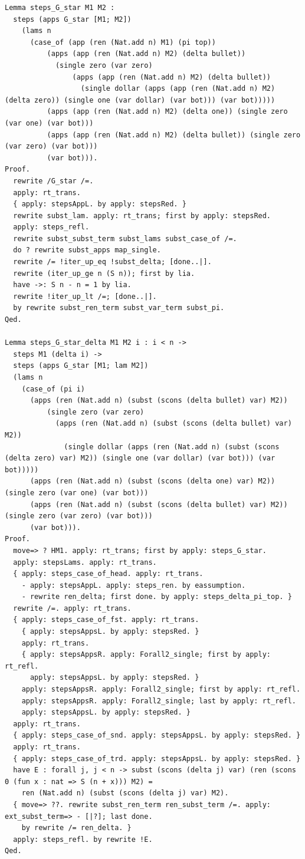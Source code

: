 \documentclass[10pt,a4paper]{amsart}
\begin{document}
\begin{lstlisting}
Lemma steps_G_star M1 M2 :
  steps (apps G_star [M1; M2])
    (lams n
      (case_of (app (ren (Nat.add n) M1) (pi top))
          (apps (app (ren (Nat.add n) M2) (delta bullet))
            (single zero (var zero)
                (apps (app (ren (Nat.add n) M2) (delta bullet))
                  (single dollar (apps (app (ren (Nat.add n) M2) (delta zero)) (single one (var dollar) (var bot))) (var bot)))))
          (apps (app (ren (Nat.add n) M2) (delta one)) (single zero (var one) (var bot)))
          (apps (app (ren (Nat.add n) M2) (delta bullet)) (single zero (var zero) (var bot)))
          (var bot))).
Proof.
  rewrite /G_star /=.
  apply: rt_trans.
  { apply: stepsAppL. by apply: stepsRed. }
  rewrite subst_lam. apply: rt_trans; first by apply: stepsRed.
  apply: steps_refl.
  rewrite subst_subst_term subst_lams subst_case_of /=.
  do ? rewrite subst_apps map_single.
  rewrite /= !iter_up_eq !subst_delta; [done..|].
  rewrite (iter_up_ge n (S n)); first by lia.
  have ->: S n - n = 1 by lia.
  rewrite !iter_up_lt /=; [done..|].
  by rewrite subst_ren_term subst_var_term subst_pi.
Qed.

Lemma steps_G_star_delta M1 M2 i : i < n ->
  steps M1 (delta i) ->
  steps (apps G_star [M1; lam M2])
  (lams n
    (case_of (pi i)
      (apps (ren (Nat.add n) (subst (scons (delta bullet) var) M2))
          (single zero (var zero)
            (apps (ren (Nat.add n) (subst (scons (delta bullet) var) M2))
              (single dollar (apps (ren (Nat.add n) (subst (scons (delta zero) var) M2)) (single one (var dollar) (var bot))) (var bot)))))
      (apps (ren (Nat.add n) (subst (scons (delta one) var) M2)) (single zero (var one) (var bot))) 
      (apps (ren (Nat.add n) (subst (scons (delta bullet) var) M2)) (single zero (var zero) (var bot)))
      (var bot))).
Proof.
  move=> ? HM1. apply: rt_trans; first by apply: steps_G_star.
  apply: stepsLams. apply: rt_trans.
  { apply: steps_case_of_head. apply: rt_trans.
    - apply: stepsAppL. apply: steps_ren. by eassumption.
    - rewrite ren_delta; first done. by apply: steps_delta_pi_top. }
  rewrite /=. apply: rt_trans.
  { apply: steps_case_of_fst. apply: rt_trans.
    { apply: stepsAppsL. by apply: stepsRed. }
    apply: rt_trans.
    { apply: stepsAppsR. apply: Forall2_single; first by apply: rt_refl.
      apply: stepsAppsL. by apply: stepsRed. }
    apply: stepsAppsR. apply: Forall2_single; first by apply: rt_refl.
    apply: stepsAppsR. apply: Forall2_single; last by apply: rt_refl.
    apply: stepsAppsL. by apply: stepsRed. }
  apply: rt_trans.
  { apply: steps_case_of_snd. apply: stepsAppsL. by apply: stepsRed. }
  apply: rt_trans.
  { apply: steps_case_of_trd. apply: stepsAppsL. by apply: stepsRed. }
  have E : forall j, j < n -> subst (scons (delta j) var) (ren (scons 0 (fun x : nat => S (n + x))) M2) =
    ren (Nat.add n) (subst (scons (delta j) var) M2).
  { move=> ??. rewrite subst_ren_term ren_subst_term /=. apply: ext_subst_term=> - [|?]; last done.
    by rewrite /= ren_delta. }
  apply: steps_refl. by rewrite !E.
Qed.


\end{lstlisting}
\end{document}
